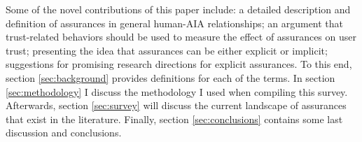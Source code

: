     Some of the novel contributions of this paper include: a detailed description and definition of assurances in general human-AIA relationships; an argument that trust-related behaviors should be used to measure the effect of assurances on user trust; presenting the idea that assurances can be either explicit or implicit; suggestions for promising research directions for explicit assurances.
    To this end, section \ref{sec:background} provides definitions for each of the terms. In section \ref{sec:methodology} I discuss the methodology I used when compiling this survey. Afterwards, section \ref{sec:survey} will discuss the current landscape of assurances that exist in the literature. Finally, section \ref{sec:conclusions} contains some last discussion and conclusions. 
